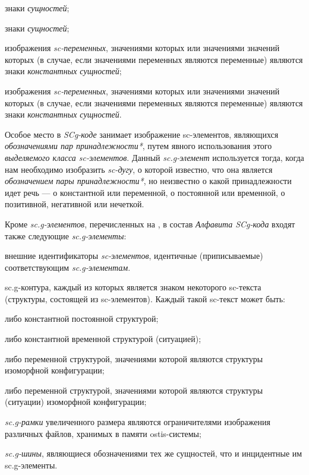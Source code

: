 \begin{textitemize}
	\item знаки \textit{ сущностей};
	\item знаки \textit{ сущностей};
	\item изображения \textit{sc-переменных}, значениями которых или значениями значений которых (в случае, если значениями переменных являются переменные) являются знаки \textit{константных  сущностей};
	\item изображения \textit{sc-переменных}, значениями которых или значениями значений которых (в случае, если значениями переменных являются переменные) являются знаки \textit{константных  сущностей}.
\end{textitemize}

Особое место в \textit{SCg-коде} занимает изображение sc-элементов, являющихся \textit{обозначениями пар принадлежности*}, путем явного использования этого \textit { выделяемого класса sc-элементов}.
Данный \textit{sc.g-элемент} используется тогда, когда нам необходимо изобразить \textit{sc-дугу}, о которой известно, что она является \textit{обозначением пары принадлежности*}, но неизвестно о какой принадлежности идет речь --- о константной или переменной, о постоянной или временной, о позитивной, негативной или нечеткой.

Кроме \textit{sc.g-элементов}, перечисленных на \textit{}, в состав \textit{Алфавита SCg-кода} входят также следующие \textit{sc.g-элементы}:
\begin{textitemize}
	\item внешние идентификаторы \textit{sc-элементов}, идентичные (приписываемые) соответствующим \textit{sc.g-элементам}.
	\item sc.g-контура, каждый из которых является знаком некоторого sc-текста (структуры, состоящей из sc-элементов). Каждый такой sc-текст может быть:
	\begin{textitemize}
		\item либо константной постоянной структурой;
		\item либо константной временной структурой (ситуацией);
		\item либо переменной структурой, значениями которой являются  структуры изоморфной  конфигурации;
		\item либо переменной структурой, значениями которой являются  структуры (ситуации) изоморфной  конфигурации;
	\end{textitemize}
	\item \textit{sc.g-рамки} увеличенного размера являются ограничителями изображения различных файлов, хранимых в памяти ostis-системы;
	\item \textit{sc.g-шины}, являющиеся обозначениями тех же сущностей, что и инцидентные им sc.g-элементы.
\end{textitemize}

